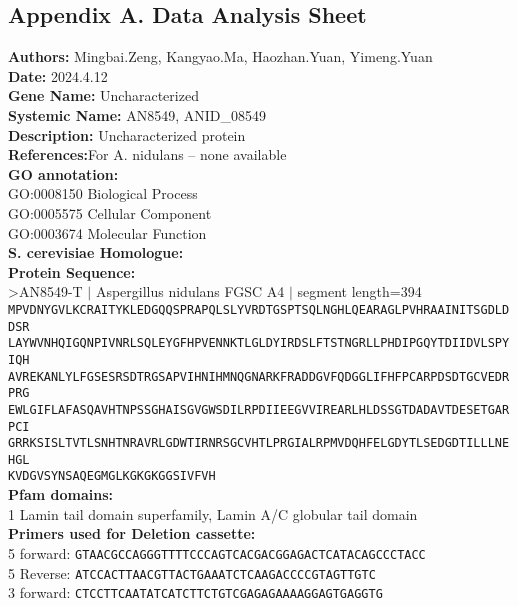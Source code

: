 \documentclass[a4paper,10pt]{article}
\begin{document}
\iffalse
\begin{appendices}
\section*{Appendix A. Data Analysis Sheet}\label{secA}

\textbf{Authors:} Mingbai.Zeng, Kangyao.Ma, Haozhan.Yuan, Yimeng.Yuan\\
\textbf{Date:} 2024.4.12\\
\textbf{Gene Name:} Uncharacterized\\
\textbf{Systemic Name:} AN8549, ANID\_08549\\
\textbf{Description:} Uncharacterized protein\\
\textbf{References:}For A. nidulans – none available\\
\textbf{GO annotation:}\\
GO:0008150 Biological Process\\
GO:0005575 Cellular Component\\
GO:0003674 Molecular Function\\
\textbf{S. cerevisiae Homologue:}\\
\textbf{Protein Sequence:}\\
\textgreater AN8549-T $\mid$ Aspergillus nidulans FGSC A4 $\mid$ segment length=394\\
\texttt{MPVDNYGVLKCRAITYKLEDGQQSPRAPQLSLYVRDTGSPTSQLNGHLQEARAGLPVHRAAINITSGDLDDSR\\
LAYWVNHQIGQNPIVNRLSQLEYGFHPVENNKTLGLDYIRDSLFTSTNGRLLPHDIPGQYTDIIDVLSPYIQH\\
AVREKANLYLFGSESRSDTRGSAPVIHNIHMNQGNARKFRADDGVFQDGGLIFHFPCARPDSDTGCVEDRPRG\\
EWLGIFLAFASQAVHTNPSSGHAISGVGWSDILRPDIIEEGVVIREARLHLDSSGTDADAVTDESETGARPCI\\
GRRKSISLTVTLSNHTNRAVRLGDWTIRNRSGCVHTLPRGIALRPMVDQHFELGDYTLSEDGDTILLLNEHGL\\
KVDGVSYNSAQEGMGLKGKGKGGSIVFVH}\\
\textbf{Pfam domains:}\\
1 Lamin tail domain superfamily, Lamin A/C globular tail domain\\
\textbf{Primers used for Deletion cassette:}\\
5 forward: \texttt{GTAACGCCAGGGTTTTCCCAGTCACGACGGAGACTCATACAGCCCTACC}\\
5 Reverse: \texttt{ATCCACTTAACGTTACTGAAATCTCAAGACCCCGTAGTTGTC}\\
3 forward: \texttt{CTCCTTCAATATCATCTTCTGTCGAGAGAAAAGGAGTGAGGTG}\\

\end{appendices}
\end{document}
